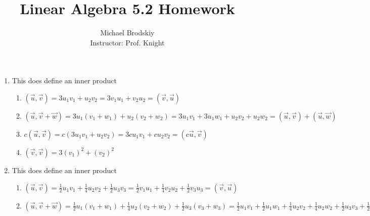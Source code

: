 \documentclass[12pt]{article}
\title{Linear Algebra 5.2 Homework}
\date{}
\author{Michael Brodskiy\\ \small Instructor: Prof. Knight}
\begin{document}
\maketitle

\begin{enumerate}

    \begin{center}
      \underline{Problems 1, 8, 9, 11, 13, 15, 17, 23, 24, 29, 33, 36, 39, 41, 43, 45, 47, 49, 50, 51, 65,}\\\underline{ 67, 75, 79, 85}
    \end{center}

  \item This does define an inner product

    \begin{enumerate}

      \item $(\overrightarrow{u},\overrightarrow{v})=3u_1v_1+u_2v_2=3v_1u_1+v_2u_2=(\overrightarrow{v},\overrightarrow{u})$ \textcolor{green}{\checkmark}

      \item $(\overrightarrow{u},\overrightarrow{v}+\overrightarrow{w})=3u_1(v_1+w_1)+u_2(v_2+w_2)=3u_1v_1+3u_1w_1+u_2v_2+u_2w_2=(\overrightarrow{u},\overrightarrow{v})+(\overrightarrow{u},\overrightarrow{w})$ \textcolor{green}{\checkmark}

      \item $c(\overrightarrow{u},\overrightarrow{v})=c(3u_1v_1+u_2v_2)=3cu_1v_1+cu_2v_2=(c\overrightarrow{u},\overrightarrow{v})$ \textcolor{green}{\checkmark}

      \item $(\overrightarrow{v},\overrightarrow{v})=3(v_1)^2+(v_2)^2$ \textcolor{green}{\checkmark}

    \end{enumerate}

    \setcounter{enumi}{7}

  \item This does define an inner product

    \begin{enumerate}

      \item $(\overrightarrow{u},\overrightarrow{v})=\frac{1}{2}u_1v_1+\frac{1}{4}u_2v_2+\frac{1}{2}u_3v_3=\frac{1}{2}v_1u_1+\frac{1}{4}v_2u_2+\frac{1}{2}v_3u_3=(\overrightarrow{v},\overrightarrow{u})$ \textcolor{green}{\checkmark}

      \item $(\overrightarrow{u},\overrightarrow{v}+\overrightarrow{w})=\frac{1}{2}u_1(v_1+w_1)+\frac{1}{4}u_2(v_2+w_2)+\frac{1}{2}u_3(v_3+w_3)=\frac{1}{2}u_1v_1+\frac{1}{2}u_1w_1+\frac{1}{4}u_2v_2+\frac{1}{4}u_2w_2+\frac{1}{2}u_3v_3+\frac{1}{2}u_3w_3=(\overrightarrow{u},\overrightarrow{v})+(\overrightarrow{u},\overrightarrow{w})$ \textcolor{green}{\checkmark}


\end{enumerate}
\end{enumerate}
\end{document}
